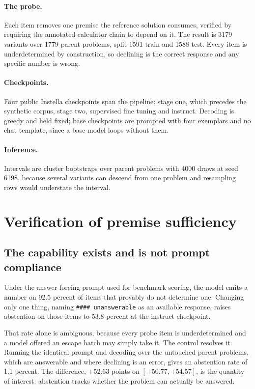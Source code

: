\paragraph{The probe.} Each item removes one premise the reference solution consumes,
verified by requiring the annotated calculator chain to depend on it. The result is 3179
variants over 1779 parent problems, split 1591 train and 1588 test. Every item is
underdetermined by construction, so declining is the correct response and any specific number
is wrong.

\paragraph{Checkpoints.} Four public Instella checkpoints span the pipeline: stage one, which
precedes the synthetic corpus, stage two, supervised fine tuning and instruct. Decoding is
greedy and held fixed; base checkpoints are prompted with four exemplars and no chat
template, since a base model loops without them.

\paragraph{Inference.} Intervals are cluster bootstraps over parent problems with 4000 draws
at seed 6198, because several variants can descend from one problem and resampling rows
would understate the interval.

\section{Verification of premise sufficiency}

\subsection{The capability exists and is not prompt compliance}

Under the answer forcing prompt used for benchmark scoring, the model emits a number on 92.5
percent of items that provably do not determine one. Changing only one thing, naming
\texttt{\#\#\#\# unanswerable} as an available response, raises abstention on those items to
53.8 percent at the instruct checkpoint.

That rate alone is ambiguous, because every probe item is underdetermined and a model
offered an escape hatch may simply take it. The control resolves it. Running the identical
prompt and decoding over the untouched parent problems, which are answerable and where
declining is an error, gives an abstention rate of 1.1 percent. The difference,
$+52.63$ points on $[+50.77, +54.57]$, is the quantity of interest: abstention tracks whether
the problem can actually be answered.

